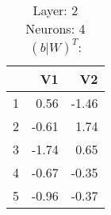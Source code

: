 \begin{table}[ht]
\centering
\begin{tabular}{rrr}
  \hline
 & V1 & V2 \\ 
  \hline
1 & 0.56 & -1.46 \\ 
  2 & -0.61 & 1.74 \\ 
  3 & -1.74 & 0.65 \\ 
  4 & -0.67 & -0.35 \\ 
  5 & -0.96 & -0.37 \\ 
   \hline
\end{tabular}
\caption{Layer: 2 Neurons: 4  $(b|W)^T$: 
} 
\end{table}
